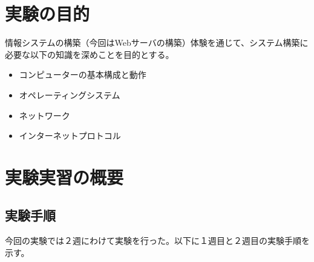\documentclass[12pt,a4paper]{jsarticle}
\numberwithin{equation}{section}
\numberwithin{figure}{section}
\numberwithin{table}{section}
\begin{document}
\section{実験の目的}
情報システムの構築（今回はWebサーバの構築）体験を通じて、システム構築に必要な以下の知識を深めことを目的とする。
\begin{itemize}
  \item コンピューターの基本構成と動作
  \item オペレーティングシステム
  \item ネットワーク
  \item インターネットプロトコル
\end{itemize}
\section{実験実習の概要}
  \subsection{実験手順}
  今回の実験では２週にわけて実験を行った。以下に１週目と２週目の実験手順を示す。
\end{document}
